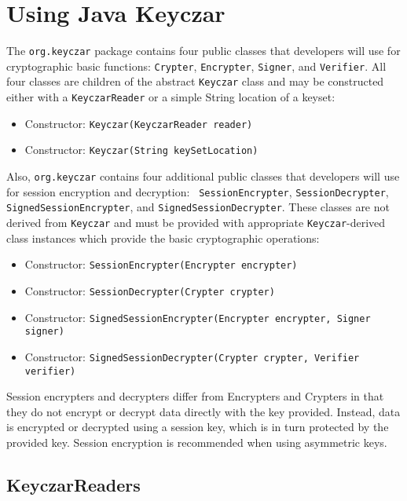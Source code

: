 \documentclass{llncs}
\begin{document}
\section{Using Java Keyczar}

The {\tt org.keyczar} package contains four public classes that
developers will use for cryptographic basic functions: {\tt Crypter},
{\tt Encrypter}, {\tt Signer}, and {\tt Verifier}. All four classes
are children of the abstract {\tt Keyczar} class and may be
constructed either with a {\tt KeyczarReader} or a simple String
location of a keyset:


\begin{itemize}
  \item Constructor: {\tt Keyczar(KeyczarReader reader)}
  \item Constructor: {\tt Keyczar(String keySetLocation)}
\end{itemize}

Also, {\tt org.keyczar} contains four additional public classes that
developers will use for session encryption and decryption: {\tt
SessionEncrypter}, {\tt SessionDecrypter}, {\tt
  SignedSessionEncrypter}, and {\tt SignedSessionDecrypter}.  These
classes are not derived from {\tt Keyczar} and must be provided with
appropriate {\tt Keyczar}-derived class instances which provide the
basic cryptographic operations:

\begin{itemize}
  \item Constructor: {\tt SessionEncrypter(Encrypter encrypter)}
  \item Constructor: {\tt SessionDecrypter(Crypter crypter)}
  \item Constructor: {\tt SignedSessionEncrypter(Encrypter encrypter,
    Signer signer)}
  \item Constructor: {\tt SignedSessionDecrypter(Crypter crypter,
    Verifier verifier)}
\end{itemize}

Session encrypters and decrypters differ from Encrypters and Crypters
in that they do not encrypt or decrypt data directly with the key
provided.  Instead, data is encrypted or decrypted using a session
key, which is in turn protected by the provided key.  Session
encryption is recommended when using asymmetric keys.

\subsection{KeyczarReaders}
\end{document}
